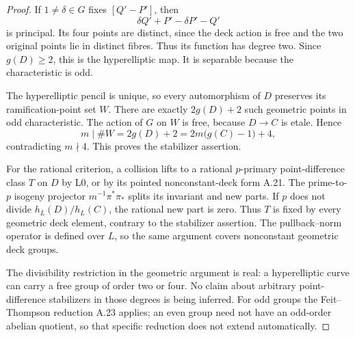 \documentclass[11pt]{article}
\begin{document}
\begin{proof}
If $1\ne\delta\in G$ fixes $[Q'-P']$, then
\[
           \delta Q'+P'-\delta P'-Q'
\]
is principal. Its four points are distinct, since the
deck action is free and the two original points lie in
distinct fibres. Thus its function has degree two.
Since $g(D)\ge2$, this is the hyperelliptic map. It is
separable because the characteristic is odd.

The hyperelliptic pencil is unique, so every automorphism
of $D$ preserves its ramification-point set $W$.
There are exactly $2g(D)+2$ such geometric points in odd
characteristic. The action of $G$ on $W$ is free, because
$D\to C$ is etale. Hence
\[
 m\mid\#W=2g(D)+2=2m\bigl(g(C)-1\bigr)+4,
\]
contradicting $m\nmid4$. This proves the stabilizer assertion.

For the rational criterion, a collision lifts to a rational
$p$-primary point-difference class $T$ on $D$ by L0,
or by its pointed nonconstant-deck form A.21. The
prime-to-$p$ isogeny projector
$m^{-1}\pi^*\pi_*$ splits its invariant and new parts.
If $p$ does not divide $h_L(D)/h_L(C)$, the rational new
part is zero. Thus $T$ is fixed by every geometric deck
element, contrary to the stabilizer assertion. The
pullback--norm operator is defined over $L$, so the same
argument covers nonconstant geometric deck groups.

The divisibility restriction in the geometric argument is
real: a hyperelliptic curve can carry a free group of
order two or four. No claim about arbitrary point-difference
stabilizers in those degrees is being inferred. For odd
groups the Feit--Thompson reduction A.23 applies; an even
group need not have an odd-order abelian quotient, so that
specific reduction does not extend automatically.
\end{proof}
\end{document}
